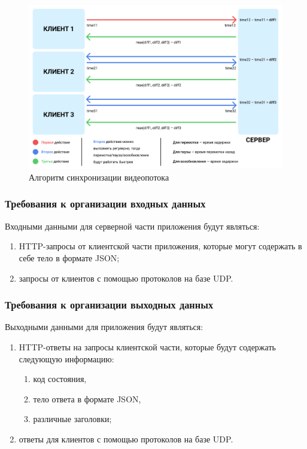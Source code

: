 \begin{figure}[p]
    \centering
    \includegraphics[width=0.97\linewidth]{../images/interaction_format.png}
    \caption{Алгоритм синхронизации видеопотока}
    \label{ris:interaction_format}
\end{figure}

\newpage

\subsubsection{Требования к организации входных данных}
Входными данными для серверной части приложения будут являться:
\begin{enumerate}
    \item HTTP-запросы от клиентской части приложения, которые могут содержать в себе
    тело в формате JSON;
    \item запросы от клиентов с помощью протоколов на базе UDP\@.
\end{enumerate}

\subsubsection{Требования к организации выходных данных}
Выходными данными для приложения будут являться:
\begin{enumerate}
    \item HTTP-ответы на запросы клиентской части, которые будут содержать следующую информацию:
    \begin{enumerate}
        \item код состояния,
        \item тело ответа в формате JSON,
        \item различные заголовки;
    \end{enumerate}
    \item ответы для клиентов с помощью протоколов на базе UDP.
\end{enumerate}